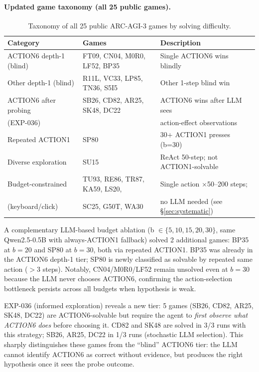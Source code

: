 \documentclass[11pt]{article}
\begin{document}
\paragraph{Updated game taxonomy (all 25 public games).}

\begin{table}[h]
\centering
\caption{Taxonomy of all 25 public ARC-AGI-3 games by solving difficulty.}
\label{tab:taxonomy}
\begin{tabular}{lll}
\toprule
Category & Games & Description \\
\midrule
ACTION6 depth-1 (blind) & FT09, CN04, M0R0, LF52, BP35 & Single ACTION6 wins blindly \\
Other depth-1 (blind) & R11L, VC33, LP85, TN36, S5I5 & Other 1-step blind win \\
ACTION6 after probing & SB26, CD82, AR25, SK48, DC22 & ACTION6 wins after LLM sees \\
(EXP-036) & & action-effect observations \\
Repeated ACTION1 & SP80 & 30+ ACTION1 presses (b=30) \\
Diverse exploration & SU15 & ReAct 50-step; not ACTION1-solvable \\
Budget-constrained & TU93, RE86, TR87, KA59, LS20, & Single action $\times$50--200 steps; \\
(keyboard/click) & SC25, G50T, WA30 & no LLM needed (see §\ref{sec:systematic}) \\
\bottomrule
\end{tabular}
\end{table}

A complementary LLM-based budget ablation (b $\in \{5,10,15,20,30\}$, same Qwen2.5-0.5B with always-ACTION1 fallback) solved 2 additional games: BP35 at $b{=}20$ and SP80 at $b{=}30$, both via repeated ACTION1. BP35 was already in the ACTION6 depth-1 tier; SP80 is newly classified as solvable by repeated same action ($>3$ steps). Notably, CN04/M0R0/LF52 remain unsolved even at $b{=}30$ because the LLM never chooses ACTION6, confirming the action-selection bottleneck persists across all budgets when hypothesis is weak.

EXP-036 (informed exploration) reveals a new tier: 5 games (SB26, CD82, AR25, SK48, DC22) are ACTION6-solvable but require the agent to \emph{first observe what ACTION6 does} before choosing it. CD82 and SK48 are solved in 3/3 runs with this strategy; SB26, AR25, DC22 in 1/3 runs (stochastic LLM selection). This sharply distinguishes these games from the ``blind'' ACTION6 tier: the LLM cannot identify ACTION6 as correct without evidence, but produces the right hypothesis once it sees the probe outcome.
\end{document}
